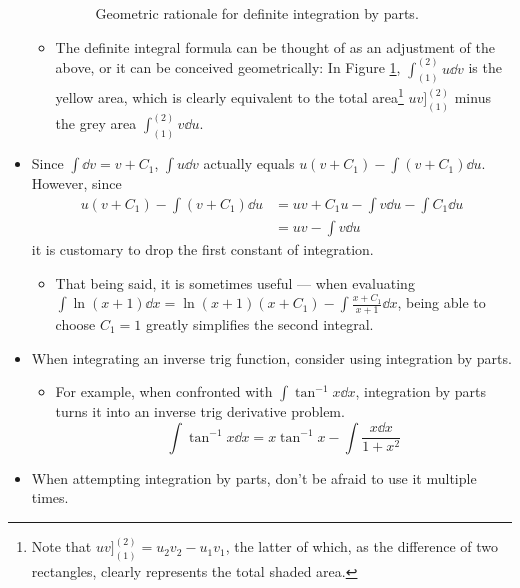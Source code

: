 \documentclass[../main.tex]{subfiles}
\begin{document}
\begin{itemize}
\begin{itemize}
\begin{figure}[h!]
            \caption{Geometric rationale for definite integration by parts.}
            \label{fig:integrationByParts}
        \end{figure}
        \item The definite integral formula can be thought of as an adjustment of the above, or it can be conceived geometrically: In Figure \ref{fig:integrationByParts}, $\int_{(1)}^{(2)}u\dd{v}$ is the yellow area, which is clearly equivalent to the total area\footnote{Note that $uv\big]_{(1)}^{(2)}=u_2v_2-u_1v_1$, the latter of which, as the difference of two rectangles, clearly represents the total shaded area.} $uv\big]_{(1)}^{(2)}$ minus the grey area $\int_{(1)}^{(2)}v\dd{u}$.
    \end{itemize}
    \item Since $\int\dd v=v+C_1$, $\int u\dd{v}$ actually equals $u(v+C_1)-\int(v+C_1)\dd{u}$. However, since
    \begin{align*}
        u(v+C_1)-\int(v+C_1)\dd{u} &= uv+C_1u-\int v\dd{u}-\int C_1\dd{u}\\
        &= uv-\int v\dd{u}
    \end{align*}
    it is customary to drop the first constant of integration.
    \begin{itemize}
        \item That being said, it is sometimes useful --- when evaluating $\int\ln(x+1)\dd{x}=\ln(x+1)(x+C_1)-\int\frac{x+C_1}{x+1}\dd{x}$, being able to choose $C_1=1$ greatly simplifies the second integral.
    \end{itemize}
    \item When integrating an inverse trig function, consider using integration by parts.
    \begin{itemize}
        \item For example, when confronted with $\int\tan^{-1}x\dd{x}$, integration by parts turns it into an inverse trig derivative problem.
        \begin{equation*}
            \int\tan^{-1}x\dd{x} = x\tan^{-1}x-\int\frac{x\dd{x}}{1+x^2}
        \end{equation*}
    \end{itemize}
    \item When attempting integration by parts, don't be afraid to use it multiple times.
    \begin{itemize}

\end{itemize}
\end{itemize}
\end{document}
